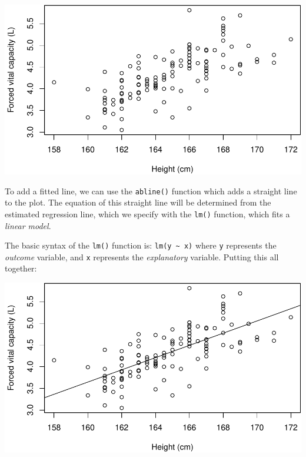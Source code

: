 \documentclass[
]{memoir}
\newenvironment{Shaded}{\begin{snugshade}}{\end{snugshade}}
\newcommand{\AttributeTok}[1]{\textcolor[rgb]{0.77,0.63,0.00}{#1}}
\newcommand{\FunctionTok}[1]{\textcolor[rgb]{0.00,0.00,0.00}{#1}}
\newcommand{\NormalTok}[1]{#1}
\newcommand{\SpecialCharTok}[1]{\textcolor[rgb]{0.00,0.00,0.00}{#1}}
\newcommand{\StringTok}[1]{\textcolor[rgb]{0.31,0.60,0.02}{#1}}
\begin{document}
\includegraphics{phcm9795-R-notes_files/figure-latex/unnamed-chunk-120-1.pdf}

To add a fitted line, we can use the \texttt{abline()} function which adds a straight line to the plot. The equation of this straight line will be determined from the estimated regression line, which we specify with the \texttt{lm()} function, which fits a \emph{linear model}.

The basic syntax of the \texttt{lm()} function is: \texttt{lm(y\ \textasciitilde{}\ x)} where \texttt{y} represents the \emph{outcome} variable, and \texttt{x} represents the \emph{explanatory} variable. Putting this all together:

\begin{Shaded}
\end{Shaded}

\includegraphics{phcm9795-R-notes_files/figure-latex/unnamed-chunk-121-1.pdf}
\end{document}
